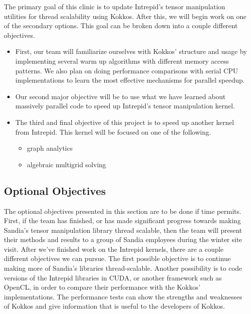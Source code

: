 \documentclass[proposal]{hmcclinic}
\begin{document}
The primary goal of this clinic is to update Intrepid's tensor
manipulation utilities for thread scalability using Kokkos. After this, we will begin work
on one of the secondary options. This goal can
be broken down into a couple different objectives. 
\begin{itemize}
    \item First, our team will familiarize ourselves with Kokkos' structure and
        usage by implementing several warm up algorithms with different memory
        access patterns.  We also plan on doing performance comparisons with
        serial CPU implementations to learn the most effective mechanisms for
        parallel speedup.
    \item Our second major objective will be to use what we have learned about
        massively parallel code to speed up Intrepid's tensor manipulation
        kernel.
    \item The third and final objective of this project is to speed up another
        kernel from Intrepid.  This kernel will be focused on one of the
        following.
        \begin{itemize}
            \item graph analytics
            \item algebraic multigrid solving
        \end{itemize}
\end{itemize}

\subsection{Optional Objectives}

The optional objectives presented in this section are to be done if time
permits. First, if the team has finished, or has made significant progress
towards making Sandia's tensor manipulation library thread scalable, then the
team will present their methods and results to a group of Sandia employees
during the winter site visit.  After we've finished work on the Intrepid
kernels, there are a couple different objectives we can pursue.  The first
possible objective is to continue making more of Sandia's libraries
thread-scalable. Another possibility is to code versions of the Intrepid
libraries in CUDA, or another framework such as OpenCL, in order to compare
their performance with the Kokkos' implementations. The performance tests can
show the strengths and weaknesses of Kokkos and give information that is useful
to the developers of Kokkos.
\end{document}
